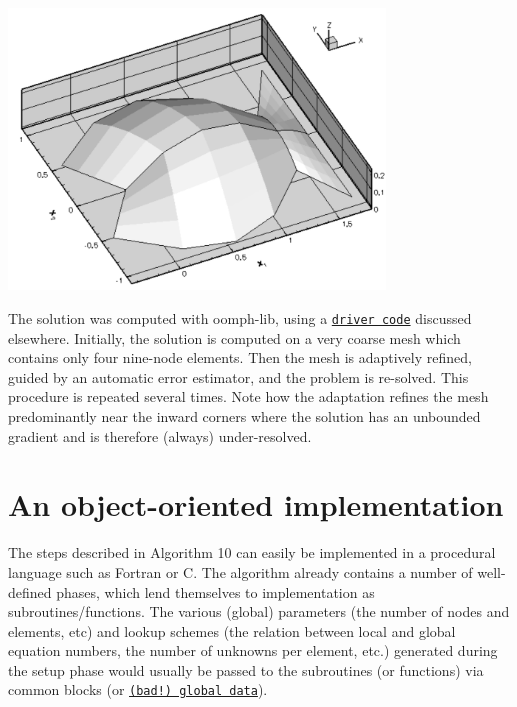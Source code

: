  
\begin{DoxyImage}
\includegraphics[width=0.75\textwidth]{fish_poisson_soln}
\end{DoxyImage}


The solution was computed with {\ttfamily oomph-\/lib}, using a \href{../../poisson/fish_poisson/html/index.html}{\tt driver code} discussed elsewhere. Initially, the solution is computed on a very coarse mesh which contains only four nine-\/node elements. Then the mesh is adaptively refined, guided by an automatic error estimator, and the problem is re-\/solved. This procedure is repeated several times. Note how the adaptation refines the mesh predominantly near the inward corners where the solution has an unbounded gradient and is therefore (always) under-\/resolved.



 

\hypertarget{index_towards_oo}{}\section{An object-\/oriented implementation}\label{index_towards_oo}
The steps described in Algorithm 10 can easily be implemented in a procedural language such as Fortran or C. The algorithm already contains a number of well-\/defined phases, which lend themselves to implementation as subroutines/functions. The various (global) parameters (the number of nodes and elements, etc) and lookup schemes (the relation between local and global equation numbers, the number of unknowns per element, etc.) generated during the setup phase would usually be passed to the subroutines (or functions) via common blocks (or \href{http://c2.com/cgi/wiki?GlobalVariablesAreBad}{\tt (bad!) global data}).

